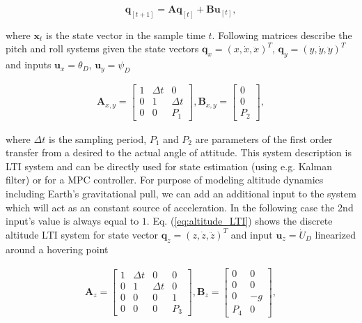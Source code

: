 \begin{equation}
\mathbf{q}_{[t+1]} = \mathbf{A}\mathbf{q}_{[t]}+ \mathbf{B}\mathbf{u}_{[t]},
\end{equation}

where $\mathbf{x}_{t}$ is the state vector in the sample time $t$. Following matrices describe the pitch and roll systems given the state vectors $\mathbf{q}_{x} = \left(x, \dot{x}, \ddot{x}\right)^T$, $\mathbf{q}_{y} = \left(y, \dot{y}, \ddot{y}\right)^T$ and inputs $\mathbf{u}_x = \theta_D$, $\mathbf{u}_y = \psi_D$

\begin{equation}
\begin{split}
\mathbf{A}_{x, y} = \begin{bmatrix}
1 & \Delta t & 0 \\
0 & 1 & \Delta t \\
0 & 0 & P_1
\end{bmatrix}, \mathbf{B}_{x, y} = \begin{bmatrix}
0\\
0\\
P_2
\end{bmatrix},
\end{split}
\label{eq:attitude_LTI}
\end{equation}

where $\Delta t$ is the sampling period, $P_1$ and $P_2$ are parameters of the first order transfer from a desired to the actual angle of attitude. This system description is LTI system and can be directly used for state estimation (using e.g. Kalman filter) or for a MPC controller. For purpose of modeling altitude dynamics including Earth's gravitational pull, we can add an additional input to the system which will act as an constant source of acceleration. In the following case the 2nd input's value is always equal to $1$. Eq. (\ref{eq:altitude_LTI}) shows the discrete altitude LTI system for state vector $\mathbf{q}_{z} = \left(z, \dot{z}, \ddot{z}\right)^T$ and input $\mathbf{u}_z = \dot{U}_D$ linearized around a hovering point

\begin{equation}
\begin{split}
\mathbf{A}_{z} = \begin{bmatrix}
1 & \Delta t & 0 & 0\\
0 & 1 & \Delta t & 0\\
0 & 0 & 0 & 1 \\
0 & 0 & 0 & P_3
\end{bmatrix}, \mathbf{B}_{z} = \begin{bmatrix}
0 & 0\\
0 & 0\\
0 & -g\\
P_4 & 0
\end{bmatrix},
\end{split}
\label{eq:altitude_LTI}
\end{equation}

